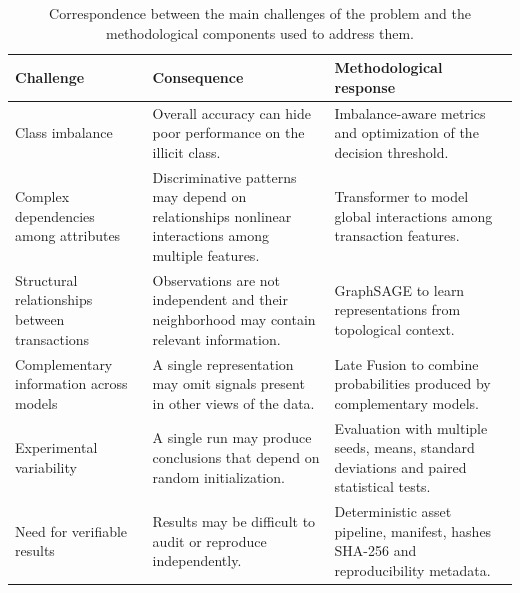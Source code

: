 \begin{table}[t]
\centering
\small
\caption{Correspondence between the main challenges of the problem and the methodological components used to address them.}
\label{tab:problem-method-mapping}
\begin{tabularx}{\textwidth}{p{}XX}
\toprule
\textbf{Challenge} & \textbf{Consequence} & \textbf{Methodological response} \\
\midrule
Class imbalance & Overall accuracy can hide poor performance on the illicit class. & Imbalance-aware metrics and optimization of the decision threshold. \\
Complex dependencies among attributes & Discriminative patterns may depend on relationships nonlinear interactions among multiple features. & Transformer to model global interactions among transaction features. \\
Structural relationships between transactions & Observations are not independent and their neighborhood may contain relevant information. & GraphSAGE to learn representations from topological context. \\
Complementary information across models & A single representation may omit signals present in other views of the data. & Late Fusion to combine probabilities produced by complementary models. \\
Experimental variability & A single run may produce conclusions that depend on random initialization. & Evaluation with multiple seeds, means, standard deviations and paired statistical tests. \\
Need for verifiable results & Results may be difficult to audit or reproduce independently. & Deterministic asset pipeline, manifest, hashes SHA-256 and reproducibility metadata. \\
\bottomrule
\end{tabularx}
\end{table}
